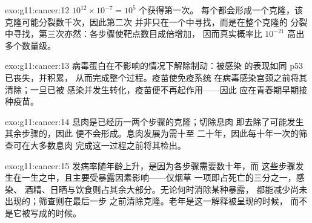 \begin{solution}{exo:g11:cancer:12}
$10^{12} \times 10^{-7} = 10^5$ 个获得第一次。
每个都会形成一个克隆，该克隆可能分裂数千次，因此第二次
并非只在一个中寻找，而是在整个克隆的
分裂中寻找，第三次亦然：各步骤使靶点数目成倍增加，
因而真实概率比 $10^{-21}$ 高出多个数量级。
\end{solution}

\begin{solution}{exo:g11:cancer:13}
病毒蛋白在不影响的情况下解除制动：被感染
的表现如同 p53 已丧失，并积累，
从而完成整个过程。疫苗使免疫系统
在病毒感染宫颈之前将其清除；一旦已被
感染并发生转化，疫苗便不再起作用——因此
应在青春期早期接种疫苗。
\end{solution}

\begin{solution}{exo:g11:cancer:14}
息肉是已经历一两个步骤的克隆；切除息肉
即去除了可能发生其余步骤的，因此
便不会形成。息肉发展为需十至
二十年，因此每十年一次的筛查可在大多数息肉
完成这一过程之前将其检出。
\end{solution}

\begin{solution}{exo:g11:cancer:15}
发病率随年龄上升，是因为各步骤需要数十年，而
这些步骤发生在一生之中，且主要受暴露因素影响——仅烟草
一项即占死亡的三分之一，感染、
酒精、日晒与饮食则占其余大部分。无论何时消除某种暴露，
都能减少尚未出现的；筛查则在最后一步
之前清除克隆。老年是这一解释被呈现的时候，
而不是它被写成的时候。
\end{solution}

